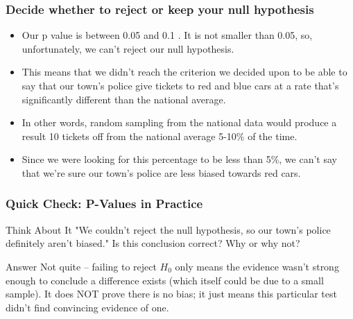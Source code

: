 \begin{frame}
\frametitle{Decide whether to reject or keep your null hypothesis}
\begin{itemize}
\item Our p value is between 0.05 and 0.1 . It is not smaller than 0.05, so, unfortunately, we can't reject our null hypothesis. 
\item This means that we didn't reach the criterion we decided upon to be able to say that our town's police give tickets to red and blue cars at a rate that's significantly different than the national average.
\item In other words, random sampling from the national data would produce a result 10 tickets off from the national average 5-10\% of the time.

\item Since we were looking for this percentage to be less than 5\%, we can't say that we're sure our town's police are less biased towards red cars.
\end{itemize}

\end{frame}

\begin{frame}[fragile]\frametitle{Quick Check: P-Values in Practice}
\begin{block}{Think About It}
"We couldn't reject the null hypothesis, so our town's police definitely aren't biased." Is this conclusion correct? Why or why not?
\end{block}
\pause
\begin{block}{Answer}
Not quite -- failing to reject $H_0$ only means the evidence wasn't strong enough to conclude a difference exists (which itself could be due to a small sample). It does NOT prove there is no bias; it just means this particular test didn't find convincing evidence of one.
\end{block}
\end{frame}
